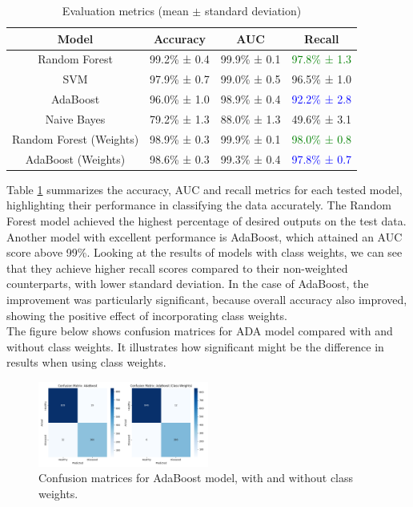 \documentclass[conference]{IEEEtran}
\begin{document}
\begin{table}[H]
    \caption{Evaluation metrics (mean $\pm$ standard deviation)}
    \label{auc_tab}
    \begin{center}
        \begin{tabular}{|c|c|c|c|}
            \hline
            \textbf{Model} & \textbf{Accuracy} & \textbf{AUC} & \textbf{Recall}  \\
            \hline
            Random Forest & 99.2\% ± 0.4 & 99.9\% ± 0.1 & \textcolor{green}{97.8\% ± 1.3}  \\
            SVM & 97.9\% ± 0.7 & 99.0\% ± 0.5 & 96.5\% ± 1.0 \\
            AdaBoost & 96.0\% ± 1.0 & 98.9\% ± 0.4 & \textcolor{blue}{92.2\% ± 2.8}  \\
            Naive Bayes & 79.2\% ± 1.3 & 88.0\% ± 1.3 & 49.6\% ± 3.1 \\
            Random Forest (Weights) & 98.9\% ± 0.3 & 99.9\% ± 0.1 & \textcolor{green}{98.0\% ± 0.8} \\
            AdaBoost (Weights) & 98.6\% ± 0.3 & 99.3\% ± 0.4 & \textcolor{blue}{97.8\% ± 0.7} \\
            \hline
        \end{tabular}
    \end{center}
\end{table}
Table \ref{auc_tab} summarizes the accuracy, AUC and recall metrics
for each tested model, highlighting their performance in
classifying the data accurately. The Random Forest model achieved
the highest percentage of desired outputs on the test data.
Another model with excellent performance is AdaBoost,
which attained an AUC score above 99\%. 
Looking at the results of models with class weights, 
we can see that they achieve higher recall scores compared to their non-weighted counterparts, with lower standard deviation.
In the case of AdaBoost, the improvement was particularly significant,
because overall accuracy also improved, showing the positive effect of incorporating class weights.
\\
\newpage
The figure below shows confusion matrices for ADA model compared with and without class weights. It illustrates
how significant might be the difference in results when using class weights.
\begin{figure}[H]
    \centering
    \includegraphics[width=0.5\textwidth]{../src/plots/conf_matrices_adaboost_comparison.png}
    \caption{Confusion matrices for AdaBoost model, with and without class weights.}
    \label{fig:confusion_matrices}
\end{figure}
\end{document}
